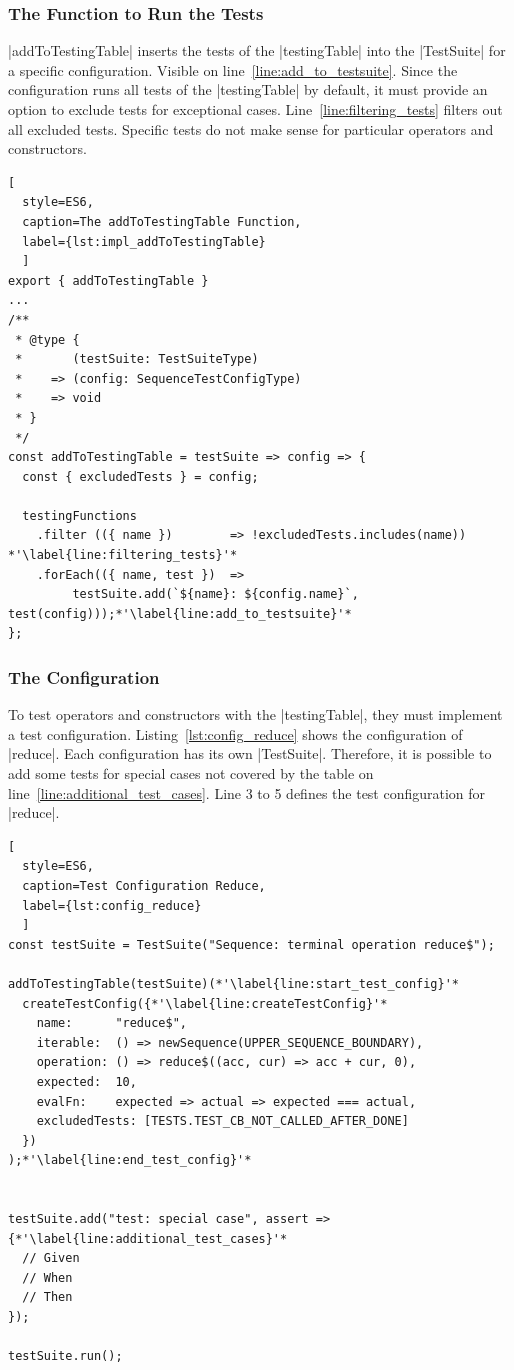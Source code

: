 \subsubsection{The Function to Run the Tests}
|addToTestingTable| inserts the tests of the |testingTable| into the |TestSuite| for a
specific configuration. Visible on line~\ref{line:add_to_testsuite}. 
Since the configuration runs all tests of the |testingTable| by default, it
must provide an option to exclude tests for exceptional cases. 
Line~\ref{line:filtering_tests} filters out all excluded tests.
Specific tests do not make sense for particular operators and constructors.

\begin{lstlisting}[
  style=ES6, 
  caption=The addToTestingTable Function,
  label={lst:impl_addToTestingTable}
  ]
export { addToTestingTable }
...
/**
 * @type {
 *       (testSuite: TestSuiteType)
 *    => (config: SequenceTestConfigType)
 *    => void
 * }
 */
const addToTestingTable = testSuite => config => {
  const { excludedTests } = config;

  testingFunctions
    .filter (({ name })        => !excludedTests.includes(name)) *'\label{line:filtering_tests}'*
    .forEach(({ name, test })  => 
         testSuite.add(`${name}: ${config.name}`, test(config)));*'\label{line:add_to_testsuite}'*
};
\end{lstlisting}

\subsubsection{The Configuration}

To test operators and constructors with the |testingTable|, they must implement 
a test configuration.
Listing~\ref{lst:config_reduce} shows the configuration of |reduce|. 
Each configuration has its own |TestSuite|. Therefore, it is possible to add
some tests for special cases not covered by the table on line~\ref{line:additional_test_cases}.
Line 3 to 5 defines the test configuration for |reduce|. 

\begin{lstlisting}[
  style=ES6, 
  caption=Test Configuration Reduce,
  label={lst:config_reduce}
  ]
const testSuite = TestSuite("Sequence: terminal operation reduce$");

addToTestingTable(testSuite)(*'\label{line:start_test_config}'*
  createTestConfig({*'\label{line:createTestConfig}'*
    name:      "reduce$",
    iterable:  () => newSequence(UPPER_SEQUENCE_BOUNDARY),
    operation: () => reduce$((acc, cur) => acc + cur, 0),
    expected:  10,
    evalFn:    expected => actual => expected === actual,
    excludedTests: [TESTS.TEST_CB_NOT_CALLED_AFTER_DONE]
  })
);*'\label{line:end_test_config}'*


testSuite.add("test: special case", assert =>
{*'\label{line:additional_test_cases}'*
  // Given
  // When
  // Then
});

testSuite.run();
\end{lstlisting}

